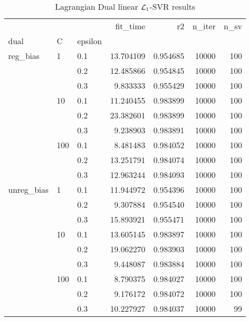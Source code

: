 \begin{table}[H]
\centering
\caption{Lagrangian Dual linear $\protect \mathcal{L}_1$-SVR results}
\label{linear_lagrangian_dual_l1_svr_cv_results}
\begin{tabular}{lllrrrr}
\toprule
           &     &     &   fit\_time &        r2 &  n\_iter &  n\_sv \\
dual & C & epsilon &            &           &         &       \\
\midrule
reg\_bias & 1   & 0.1 &  13.704109 &  0.954685 &   10000 &   100 \\
           &     & 0.2 &  12.485866 &  0.954845 &   10000 &   100 \\
           &     & 0.3 &   9.833333 &  0.955429 &   10000 &   100 \\
           & 10  & 0.1 &  11.240455 &  0.983899 &   10000 &   100 \\
           &     & 0.2 &  23.382601 &  0.983899 &   10000 &   100 \\
           &     & 0.3 &   9.238903 &  0.983891 &   10000 &   100 \\
           & 100 & 0.1 &   8.481483 &  0.984052 &   10000 &   100 \\
           &     & 0.2 &  13.251791 &  0.984074 &   10000 &   100 \\
           &     & 0.3 &  12.963244 &  0.984093 &   10000 &   100 \\
unreg\_bias & 1   & 0.1 &  11.944972 &  0.954396 &   10000 &   100 \\
           &     & 0.2 &   9.307884 &  0.954540 &   10000 &   100 \\
           &     & 0.3 &  15.893921 &  0.955471 &   10000 &   100 \\
           & 10  & 0.1 &  13.605145 &  0.983897 &   10000 &   100 \\
           &     & 0.2 &  19.062270 &  0.983903 &   10000 &   100 \\
           &     & 0.3 &   9.448087 &  0.983884 &   10000 &   100 \\
           & 100 & 0.1 &   8.790375 &  0.984027 &   10000 &   100 \\
           &     & 0.2 &   9.176172 &  0.984072 &   10000 &   100 \\
           &     & 0.3 &  10.227927 &  0.984037 &   10000 &    99 \\
\bottomrule
\end{tabular}
\end{table}
